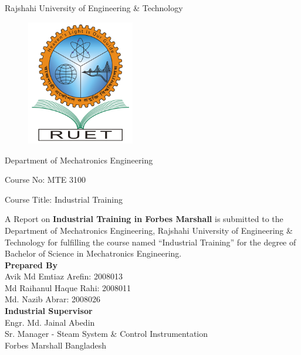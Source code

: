 \begin{center}
    Rajshahi University of Engineering \& Technology
\end{center}
\begin{figure}[h!]
    \centering
    \includegraphics[width=4.7cm]{figs/RUET.png}
    \label{fig:ruet1}
\end{figure}

\begin{center}
    Department of Mechatronics Engineering

    Course No: MTE 3100 

    Course Title: Industrial Training
\end{center}
\setlength{\columnsep}{0.1\textwidth}

\noindent A Report on \textbf{Industrial Training in Forbes Marshall} is submitted to the Department of Mechatronics Engineering, Rajshahi University of Engineering \& Technology for fulfilling the course named “Industrial Training” for the degree of Bachelor of Science in Mechatronics Engineering.\\

\noindent \textbf{Prepared By}\\
Avik Md Emtiaz Arefin: 2008013\\
Md Raihanul Haque Rahi: 2008011\\
Md. Nazib Abrar: 2008026\\

\noindent \textbf{Industrial Supervisor}\\
Engr. Md. Jainal Abedin\\
Sr. Manager - Steam System \& Control Instrumentation\\
Forbes Marshall Bangladesh
